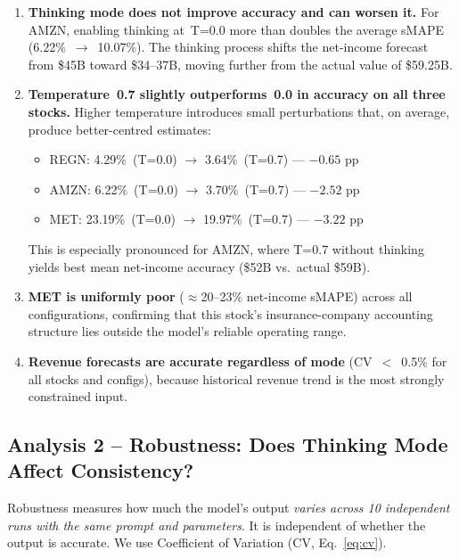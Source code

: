 \documentclass[11pt,a4paper]{article}
\begin{document}
\begin{enumerate}
  \item \textbf{Thinking mode does not improve accuracy and can worsen it.}
        For AMZN, enabling thinking at~T=0.0 more than doubles the average sMAPE
        (6.22\%~$\to$~10.07\%).  The thinking process shifts the net-income forecast
        from \$45B toward \$34--37B, moving further from the actual value of
        \$59.25B.

  \item \textbf{Temperature~0.7 slightly outperforms~0.0 in accuracy on all three
        stocks.}  Higher temperature introduces small perturbations that, on average,
        produce better-centred estimates:
        \begin{itemize}
          \item REGN: 4.29\%~(T=0.0) $\to$ 3.64\%~(T=0.7) --- $-0.65$ pp
          \item AMZN: 6.22\%~(T=0.0) $\to$ 3.70\%~(T=0.7) --- $-2.52$ pp
          \item MET:  23.19\%~(T=0.0) $\to$ 19.97\%~(T=0.7) --- $-3.22$ pp
        \end{itemize}
        This is especially pronounced for AMZN, where T=0.7 without thinking yields
        best mean net-income accuracy (\$52B vs.\ actual \$59B).

  \item \textbf{MET is uniformly poor} ($\approx$20--23\% net-income sMAPE) across all
        configurations, confirming that this stock's insurance-company accounting
        structure lies outside the model's reliable operating range.

  \item \textbf{Revenue forecasts are accurate regardless of mode} (CV~$<$~0.5\% for
        all stocks and configs), because historical revenue trend is the most
        strongly constrained input.
\end{enumerate}

\subsection{Analysis 2 -- Robustness: Does Thinking Mode Affect Consistency?}

Robustness measures how much the model's output \emph{varies across 10 independent
runs with the same prompt and parameters}.  It is independent of whether the output
is accurate.  We use Coefficient of Variation (CV, Eq.~\ref{eq:cv}).
\end{document}
